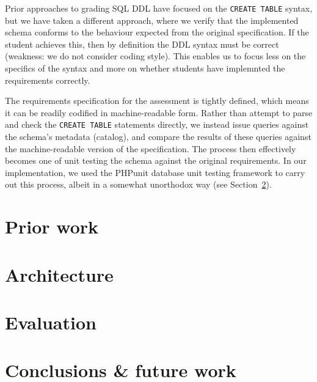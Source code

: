 \documentclass[sigconf, authordraft]{acmart}
\begin{document}
Prior approaches to grading SQL DDL have focused on the \texttt{CREATE TABLE} syntax, but we have taken a different approach, where we verify that the implemented schema conforms to the behaviour expected from the original specification. If the student achieves this, then by definition the DDL syntax must be correct (weakness: we do not consider coding style). This enables us to focus less on the specifics of the syntax and more on whether students have implemnted the requirements correctly.

The requirements specification for the assessment is tightly defined, which means it can be readily codified in machine-readable form. Rather than attempt to parse and check the \texttt{CREATE TABLE} statements directly, we instead issue queries against the schema's metadata (catalog), and compare the results of these queries against the machine-readable version of the specification. The process then effectively becomes one of unit testing the schema against the original requirements. In our implementation, we used the PHPunit database unit testing framework to carry out this process, albeit in a somewhat unorthodox way (see Section~\ref{sec-architecture}).


\section{Prior work}
\label{sec-literature}

\section{Architecture}
\label{sec-architecture}

\section{Evaluation}
\label{sec-evaluation}

\section{Conclusions \& future work}
\label{sec-conclusion}

\newpage


\end{document}
